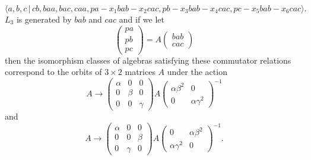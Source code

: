 \documentclass[10pt,thmsa]{article}
\begin{document}
\[
\langle
a,b,c\,|%
\,cb,baa,bac,caa,pa-x_{1}bab-x_{2}cac,pb-x_{3}bab-x_{4}cac,pc-x_{5}bab-x_{6}cac\rangle . 
\]%
$L_{3}$ is generated by $bab$ and $cac$ and if we let 
\[
\left( 
\begin{array}{l}
pa \\ 
pb \\ 
pc%
\end{array}%
\right) =A\left( 
\begin{array}{l}
bab \\ 
cac%
\end{array}%
\right) 
\]%
then the isomorphism classes of algebras satisfying these commutator
relations correspond to the orbits of $3\times 2$ matrices $A$ under the
action 
\[
A\rightarrow \left( 
\begin{array}{lll}
\alpha & 0 & 0 \\ 
0 & \beta & 0 \\ 
0 & 0 & \gamma%
\end{array}%
\right) A\left( 
\begin{array}{ll}
\alpha \beta ^{2} & 0 \\ 
0 & \alpha \gamma ^{2}%
\end{array}%
\right) ^{-1} 
\]%
and 
\[
A\rightarrow \left( 
\begin{array}{lll}
\alpha & 0 & 0 \\ 
0 & 0 & \beta \\ 
0 & \gamma & 0%
\end{array}%
\right) A\left( 
\begin{array}{ll}
0 & \alpha \beta ^{2} \\ 
\alpha \gamma ^{2} & 0%
\end{array}%
\right) ^{-1}. 
\]
\end{document}
